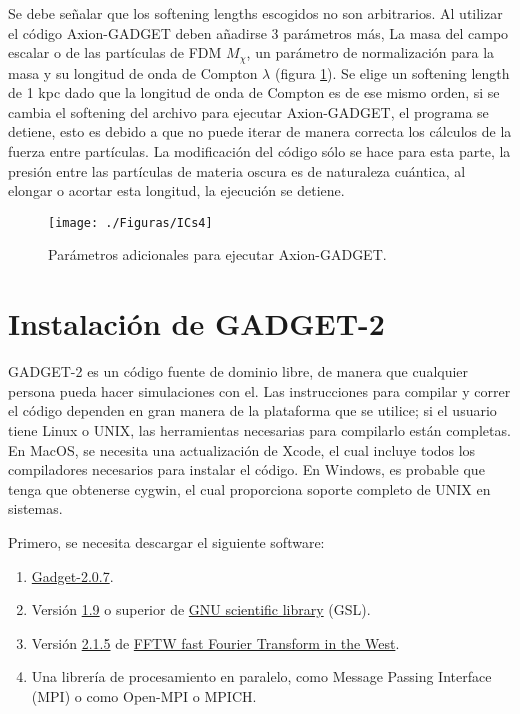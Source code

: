 \documentclass[a4paper,openright,12pt]{book}
\begin{document}
Se debe señalar que los softening lengths escogidos no son arbitrarios. Al utilizar el código Axion-GADGET deben añadirse 3 parámetros más, La masa del campo escalar o de las partículas de FDM $M_{\chi}$, un parámetro de normalización para la masa y su longitud de onda de Compton $\lambda$ (figura \ref{fig 4.2}). Se elige un softening length de 1 kpc dado que la longitud de onda de Compton es de ese mismo orden, si se cambia el softening del archivo para ejecutar Axion-GADGET, el programa se detiene, esto es debido a que no puede iterar de manera correcta los cálculos de la fuerza entre partículas. La modificación del código sólo se hace para esta parte, la presión entre las partículas de materia oscura es de naturaleza cuántica, al elongar o acortar esta longitud, la ejecución se detiene.

\begin{figure}
\centering \texttt{[image: ./Figuras/ICs4]}
\caption{\footnotesize{Parámetros adicionales para ejecutar Axion-GADGET.}}
\label{fig 4.2}
\end{figure}

 


\appendix 
\chapter{Instalación de GADGET-2}\label{Apend.A}
GADGET-2 es un código fuente de dominio libre, de manera que cualquier persona pueda hacer simulaciones con el. Las instrucciones para compilar y correr el código dependen en gran manera de la plataforma que se utilice; si el usuario tiene Linux o UNIX, las herramientas necesarias para compilarlo están completas. En MacOS, se necesita una actualización de \textsf{Xcode}, el cual incluye todos los compiladores necesarios para instalar el código. En Windows, es probable que tenga que obtenerse \textsf{cygwin}, el cual proporciona soporte completo de UNIX en sistemas.

Primero, se necesita descargar el siguiente software:
\begin{enumerate}
\item \underline{Gadget-2.0.7}.
\item Versión \underline{1.9} o superior de \underline{GNU scientific library} (GSL).
\item Versión \underline{2.1.5} de \underline{FFTW fast Fourier Transform in the West}.
\item Una librería de procesamiento en paralelo, como Message Passing Interface (MPI) o como \textsf{Open-MPI} o \textsf{MPICH}.
\end{enumerate}
\end{document}

